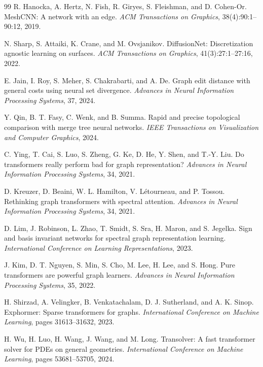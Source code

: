 \documentclass[twocolumn, a4paper, 10pt]{article}
\begin{document}
\begin{thebibliography}{99}
R. Hanocka, A. Hertz, N. Fish, R. Giryes, S. Fleishman, and D. Cohen-Or.
MeshCNN: A network with an edge.
\textit{ACM Transactions on Graphics}, 38(4):90:1--90:12, 2019.

N. Sharp, S. Attaiki, K. Crane, and M. Ovsjanikov.
DiffusionNet: Discretization agnostic learning on surfaces.
\textit{ACM Transactions on Graphics}, 41(3):27:1--27:16, 2022.

E. Jain, I. Roy, S. Meher, S. Chakrabarti, and A. De.
Graph edit distance with general costs using neural set divergence.
\textit{Advances in Neural Information Processing Systems}, 37, 2024.

Y. Qin, B. T. Fasy, C. Wenk, and B. Summa.
Rapid and precise topological comparison with merge tree neural networks.
\textit{IEEE Transactions on Visualization and Computer Graphics}, 2024.


C. Ying, T. Cai, S. Luo, S. Zheng, G. Ke, D. He, Y. Shen, and T.-Y. Liu.
Do transformers really perform bad for graph representation?
\textit{Advances in Neural Information Processing Systems}, 34, 2021.

D. Kreuzer, D. Beaini, W. L. Hamilton, V. L\'etourneau, and P. Tossou.
Rethinking graph transformers with spectral attention.
\textit{Advances in Neural Information Processing Systems}, 34, 2021.

D. Lim, J. Robinson, L. Zhao, T. Smidt, S. Sra, H. Maron, and S. Jegelka.
Sign and basis invariant networks for spectral graph representation learning.
\textit{International Conference on Learning Representations}, 2023.

J. Kim, D. T. Nguyen, S. Min, S. Cho, M. Lee, H. Lee, and S. Hong.
Pure transformers are powerful graph learners.
\textit{Advances in Neural Information Processing Systems}, 35, 2022.

H. Shirzad, A. Velingker, B. Venkatachalam, D. J. Sutherland, and A. K. Sinop.
Exphormer: Sparse transformers for graphs.
\textit{International Conference on Machine Learning}, pages 31613--31632, 2023.

H. Wu, H. Luo, H. Wang, J. Wang, and M. Long.
Transolver: A fast transformer solver for PDEs on general geometries.
\textit{International Conference on Machine Learning}, pages 53681--53705, 2024.


\end{thebibliography}
\end{document}
